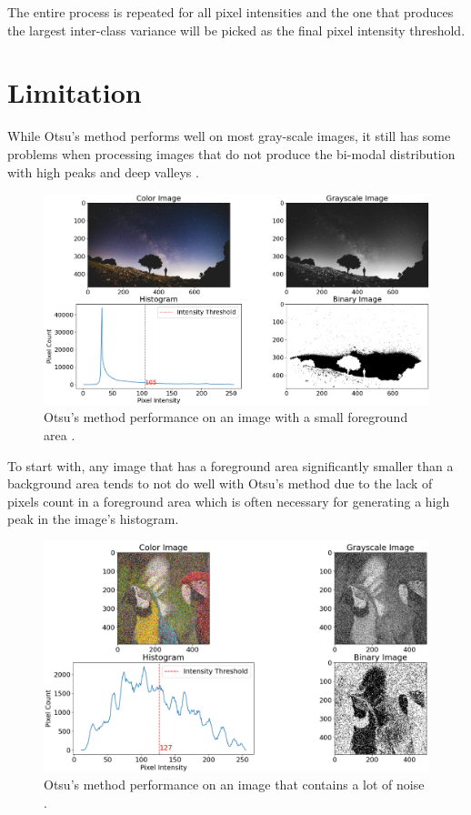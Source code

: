 \documentclass[conference]{IEEEtran}
\begin{document}
The entire process is repeated for all pixel intensities and the one that produces the largest inter-class variance will be picked as the final pixel intensity threshold.

\section{Limitation}
While Otsu's method performs well on most gray-scale images, it still has some problems when processing images that do not produce the bi-modal distribution with high peaks and deep valleys \cite{kang-and-atul:2019}.
\begin{figure}[!htb]
    \centering
    \includegraphics[width=\linewidth]{small_object_image.png}
    \caption{Otsu's method performance on an image with a small foreground area \cite{altphotos:2017}.}
\end{figure}
To start with, any image that has a foreground area significantly smaller than a background area tends to not do well with Otsu's method due to the lack of pixels count in a foreground area which is often necessary for generating a high peak in the image's histogram.
\begin{figure}[!htb]
    \centering
    \includegraphics[width=\linewidth, scale=1.5]{noisy_image.png}
    \caption{Otsu's method performance on an image that contains a lot of noise \cite{qrcode:2012}.}
\end{figure}
\end{document}
